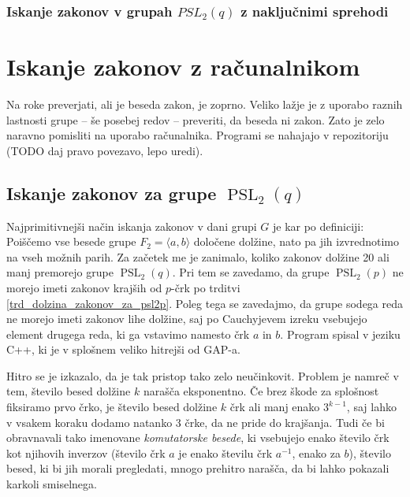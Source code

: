 \documentclass[mat1, tisk]{fmfdelo}
\numberwithin{equation}{section}  %
\begin{document}
    \subsubsection{Iskanje zakonov v grupah $PSL_2(q)$ z naključnimi sprehodi}
    


\cite{Kozma_Thom_2016}

\section{Iskanje zakonov z računalnikom}

Na roke preverjati, ali je beseda zakon, je zoprno. Veliko lažje je z uporabo raznih lastnosti grupe -- še posebej redov -- preveriti, da beseda ni zakon. 
Zato je zelo naravno pomisliti na uporabo računalnika. %
Programi se nahajajo v repozitoriju (TODO daj pravo povezavo, lepo uredi).

\subsection{Iskanje zakonov za grupe $\operatorname{PSL}_2(q)$} %

Najprimitivnejši način iskanja zakonov v dani grupi $G$ je kar po definiciji: Poiščemo vse besede grupe $F_2 = \langle a,b \rangle$ določene dolžine, nato pa jih izvrednotimo na vseh možnih parih.
Za začetek me je zanimalo, koliko zakonov dolžine 20 ali manj premorejo grupe $\operatorname{PSL}_2(q)$. Pri tem se zavedamo, da grupe $\operatorname{PSL}_2(p)$ ne morejo imeti zakonov krajših od $p$-črk po trditvi \ref{trd_dolzina_zakonov_za_psl2p}.
Poleg tega se zavedajmo, da grupe sodega reda ne morejo imeti zakonov lihe dolžine, saj po Cauchyjevem izreku vsebujejo element drugega reda, ki ga vstavimo namesto črk $a$ in $b$. 
Program spisal v jeziku C++, ki je v splošnem veliko hitrejši od GAP-a.

Hitro se je izkazalo, da je tak pristop tako zelo neučinkovit. Problem je namreč v tem, število besed dolžine $k$ narašča eksponentno. Če brez škode za splošnost fiksiramo prvo črko, je število besed dolžine $k$ črk ali manj enako $3^{k - 1}$,
saj lahko v vsakem koraku dodamo natanko 3 črke, da ne pride do krajšanja. Tudi če bi obravnavali tako imenovane \emph{komutatorske besede}, ki vsebujejo enako število črk kot njihovih inverzov (število črk $a$ je enako številu črk $a^{-1}$, enako za $b$),
število besed, ki bi jih morali pregledati, mnogo prehitro narašča, da bi lahko pokazali karkoli smiselnega.
\end{document}
